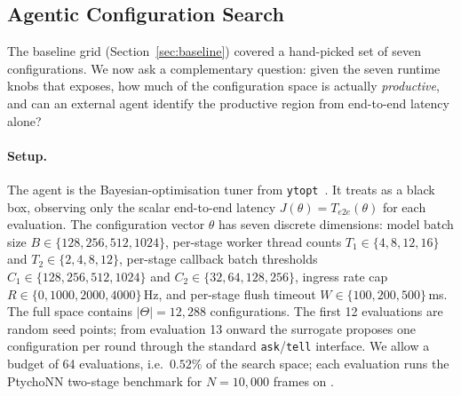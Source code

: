 %
%
%

\subsection{Agentic Configuration Search}
\label{sec:agentic-search}

The baseline grid (Section~\ref{sec:baseline}) covered a hand-picked set of
seven configurations.  We now ask a complementary question: given the seven
runtime knobs that \drava{} exposes, how much of the configuration space is
actually \emph{productive}, and can an external agent identify the
productive region from end-to-end latency alone?

\paragraph{Setup.}
The agent is the Bayesian-optimisation tuner from
\texttt{ytopt}~\cite{ytopt}.  It treats \drava{} as a black box, observing
only the scalar end-to-end latency $J(\theta) = T_{e2e}(\theta)$ for each
evaluation.  The configuration vector $\theta$ has seven discrete dimensions:
model batch size $B \in \{128, 256, 512, 1024\}$, per-stage worker thread
counts $T_1 \in \{4, 8, 12, 16\}$ and $T_2 \in \{2, 4, 8, 12\}$, per-stage
callback batch thresholds $C_1 \in \{128, 256, 512, 1024\}$ and
$C_2 \in \{32, 64, 128, 256\}$, ingress rate cap
$R \in \{0, 1000, 2000, 4000\}$\,Hz, and per-stage flush timeout
$W \in \{100, 200, 500\}$\,ms.  The full space contains
$|\Theta| = 12{,}288$ configurations.  The first 12 evaluations are random
seed points; from evaluation 13 onward the surrogate proposes one
configuration per round through the standard \texttt{ask}/\texttt{tell}
interface.  We allow a budget of 64 evaluations, i.e.\ $0.52\%$ of the
search space; each evaluation runs the PtychoNN two-stage benchmark for
$N = 10{,}000$ frames on .


